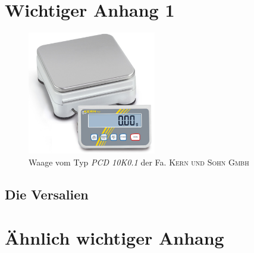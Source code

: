 \chapter{Wichtiger Anhang 1}

\begin{figure}[htb]
\centering		\includegraphics[width=0.50\textwidth]{Pictures/Waage.png}
\caption{Waage vom Typ \textit{PCD 10K0.1} der Fa. \textsc{Kern und Sohn Gmbh}}
\label{fig:}
\end{figure}

\section{Die Versalien}


\chapter{Ähnlich wichtiger Anhang}
